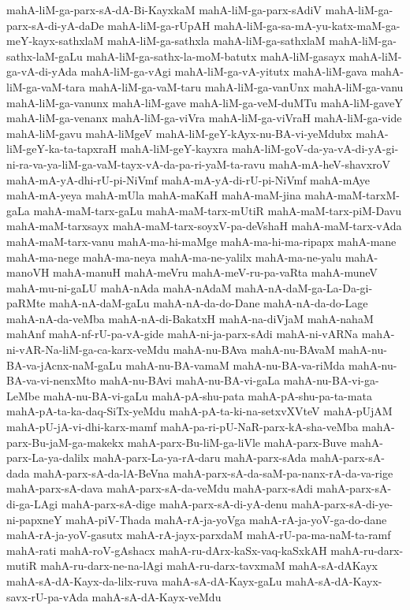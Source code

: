{mahA-liM-ga-parx-sA-dA-Bi-KayxkaM
mahA-liM-ga-parx-sAdiV
mahA-liM-ga-parx-sA-di-yA-daDe
mahA-liM-ga-rUpAH
mahA-liM-ga-sa-mA-yu-katx-maM-ga-meY-kayx-sathxlaM
mahA-liM-ga-sathxla
mahA-liM-ga-sathxlaM
mahA-liM-ga-sathx-laM-gaLu
mahA-liM-ga-sathx-la-moM-batutx
mahA-liM-gasayx
mahA-liM-ga-vA-di-yAda
mahA-liM-ga-vAgi
mahA-liM-ga-vA-yitutx
mahA-liM-gava
mahA-liM-ga-vaM-tara
mahA-liM-ga-vaM-taru
mahA-liM-ga-vanUnx
mahA-liM-ga-vanu
mahA-liM-ga-vanunx
mahA-liM-gave
mahA-liM-ga-veM-duMTu
mahA-liM-gaveY
mahA-liM-ga-venanx
mahA-liM-ga-viVra
mahA-liM-ga-viVraH
mahA-liM-ga-vide
mahA-liM-gavu
mahA-liMgeV
mahA-liM-geY-kAyx-nu-BA-vi-yeMdubx
mahA-liM-geY-ka-ta-tapxraH
mahA-liM-geY-kayxra
mahA-liM-goV-da-ya-vA-di-yA-gi-ni-ra-va-ya-liM-ga-vaM-tayx-vA-da-pa-ri-yaM-ta-ravu
mahA-mA-heV-shavxroV
mahA-mA-yA-dhi-rU-pi-NiVmf
mahA-mA-yA-di-rU-pi-NiVmf
mahA-mAye
mahA-mA-yeya
mahA-mUla
mahA-maKaH
mahA-maM-jina
mahA-maM-tarxM-gaLa
mahA-maM-tarx-gaLu
mahA-maM-tarx-mUtiR
mahA-maM-tarx-piM-Davu
mahA-maM-tarxsayx
mahA-maM-tarx-soyxV-pa-deVshaH
mahA-maM-tarx-vAda
mahA-maM-tarx-vanu
mahA-ma-hi-maMge
mahA-ma-hi-ma-ripapx
mahA-mane
mahA-ma-nege
mahA-ma-neya
mahA-ma-ne-yalilx
mahA-ma-ne-yalu
mahA-manoVH
mahA-manuH
mahA-meVru
mahA-meV-ru-pa-vaRta
mahA-muneV
mahA-mu-ni-gaLU
mahA-nAda
mahA-nAdaM
mahA-nA-daM-ga-La-Da-gi-paRMte
mahA-nA-daM-gaLu
mahA-nA-da-do-Dane
mahA-nA-da-do-Lage
mahA-nA-da-veMba
mahA-nA-di-BakatxH
mahA-na-diVjaM
mahA-nahaM
mahAnf
mahA-nf-rU-pa-vA-gide
mahA-ni-ja-parx-sAdi
mahA-ni-vARNa
mahA-ni-vAR-Na-liM-ga-ca-karx-veMdu
mahA-nu-BAva
mahA-nu-BAvaM
mahA-nu-BA-va-jAcnx-naM-gaLu
mahA-nu-BA-vamaM
mahA-nu-BA-va-riMda
mahA-nu-BA-va-vi-nenxMto
mahA-nu-BAvi
mahA-nu-BA-vi-gaLa
mahA-nu-BA-vi-ga-LeMbe
mahA-nu-BA-vi-gaLu
mahA-pA-shu-pata
mahA-pA-shu-pa-ta-mata
mahA-pA-ta-ka-daq-SiTx-yeMdu
mahA-pA-ta-ki-na-setxvXVteV
mahA-pUjAM
mahA-pU-jA-vi-dhi-karx-mamf
mahA-pa-ri-pU-NaR-parx-kA-sha-veMba
mahA-parx-Bu-jaM-ga-makekx
mahA-parx-Bu-liM-ga-liVle
mahA-parx-Buve
mahA-parx-La-ya-dalilx
mahA-parx-La-ya-rA-daru
mahA-parx-sAda
mahA-parx-sA-dada
mahA-parx-sA-da-lA-BeVna
mahA-parx-sA-da-saM-pa-nanx-rA-da-va-rige
mahA-parx-sA-dava
mahA-parx-sA-da-veMdu
mahA-parx-sAdi
mahA-parx-sA-di-ga-LAgi
mahA-parx-sA-dige
mahA-parx-sA-di-yA-denu
mahA-parx-sA-di-ye-ni-papxneY
mahA-piV-Thada
mahA-rA-ja-yoVga
mahA-rA-ja-yoV-ga-do-dane
mahA-rA-ja-yoV-gasutx
mahA-rA-jayx-parxdaM
mahA-rU-pa-ma-naM-ta-ramf
mahA-rati
mahA-roV-gAshacx
mahA-ru-dArx-kaSx-vaq-kaSxkAH
mahA-ru-darx-mutiR
mahA-ru-darx-ne-na-lAgi
mahA-ru-darx-tavxmaM
mahA-sA-dAKayx
mahA-sA-dA-Kayx-da-lilx-ruva
mahA-sA-dA-Kayx-gaLu
mahA-sA-dA-Kayx-savx-rU-pa-vAda
mahA-sA-dA-Kayx-veMdu
}
